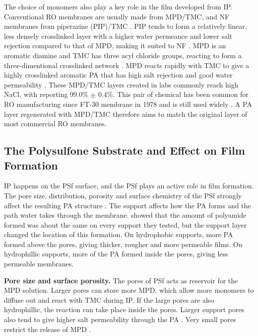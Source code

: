 The choice of monomers also play a key role in the film developed from IP. Conventional RO membranes are usually made from MPD/TMC, and NF membranes from piperazine (PIP)/TMC \citep{Chen2024}. PIP tends to form a relatively linear, less densely crosslinked layer with a higher water permeance and lower salt rejection compared to that of MPD, making it suited to NF \citep{Wang2026}. MPD is an aromatic diamine and TMC has three acyl chloride groups, reacting to form a three-dimentional crosslinked network \citep{Wang2026}. MPD reacts rapidly with TMC to give a highly crosslinked aromatic PA that has high salt rejection and good water permeability \citep{Wang2026}. These MPD/TMC layers created in labs commonly reach high NaCl, with \citet{Huang2022} reporting 99.0\% $\pm$ 0.4\%. This pair of chemical has been common for RO manufacturing since FT-30 membrane in 1978 and is still used widely \citep{Wang2026}. A PA layer regenerated with MPD/TMC therefore aims to match the original layer of most commercial RO membranes. 


\subsection{The Polysulfone Substrate and Effect on Film Formation}
\label{sec:substrate}

IP happens on the PSf surface, and the PSf plays an active role in film formation. The pore size, distribution, porosity and surface chemistry of the PSf strongly affect the resulting PA structure \citep{Singh2006}. The support affects how the PA forms and the path water takes through the membrane. \citet{GhoshHoek2009} showed that the amount of polyamide formed was about the same on every support they tested, but the support layer changed the location of this formation. On hydrophobic supports, more PA formed above the pores, giving thicker, rougher and more permeable films. On hydrophillic supports, more of the PA formed inside the pores, giving less permeable membranes. 

\textbf{Pore size and surface porosity.}
The pores of PSf acts as reservoir for the MPD solution. Larger pores can store more MPD, which allow more monomers to diffuse out and react with TMC during IP. If the large pores are also hydrophillic, the reaction can take place inside the pores. Larger support pores also tend to give higher salt permeability through the PA \citep{GhoshHoek2009}. Very small pores restrict the release of MPD \citep{Huang2022}. 



